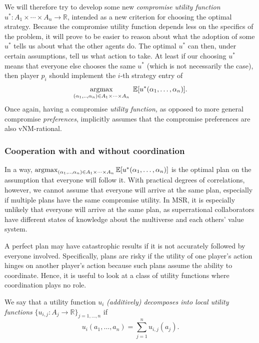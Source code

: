 We will therefore try to develop some new \emph{compromise utility
function} \(u^{*}\colon A_{1} \times \dotsm \times A_{n} \rightarrow \mathbb{R}\),
intended as a new criterion for choosing the optimal strategy. Because
the compromise utility function depends less on the specifics of the
problem, it will prove to be easier to reason about what the adoption of
some \(u^{*}\) tells us about what the other agents do. The optimal
\(u^{*}\) can then, under certain assumptions, tell us what action to
take. At least if our choosing \(u^{*}\) means that everyone else
chooses the same \(u^{*}\) (which is not necessarily the case), then
player \(p_{i}\) should implement the \(i\)-th strategy entry of
$$
\operatorname*{\arg\!\max}_{(\alpha_{1},..,\alpha_{n}) \in A_{1} \times \dotsm \times A_{n}}\ \mathbb{E}\lbrack u^{*}(\alpha_{1},\dotsc,\alpha_{n})\rbrack.
$$
Once again, having a compromise \emph{utility function,} as opposed to
more general compromise \emph{preferences}, implicitly assumes that the
compromise preferences are also vNM-rational.

\hypertarget{cooperation-with-and-without-coordination}{\subsubsection{Cooperation
with and without
coordination}\label{cooperation-with-and-without-coordination}}

In a way, \(\operatorname*{\arg\!\max}_{(\alpha_{1},..,\alpha_{n}) \in A_{1} \times \dotsm \times A_{n}}
\mathbb{E}\lbrack u^{*}(\alpha_{1},\dotsc,\alpha_{n})\rbrack\) is the optimal plan on the assumption
that everyone will follow it. With practical degrees of correlations, however, we cannot assume that
everyone will arrive at the same plan, especially if multiple plans have
the same compromise utility. In MSR, it is especially unlikely that
everyone will arrive at the same plan, as superrational collaborators
have different states of knowledge about the multiverse and each others'
value system.

A perfect plan may have catastrophic results if it is not accurately
followed by everyone involved. Specifically, plans are risky if the
utility of one player's action hinges on another player's action because
such plans assume the ability to coordinate. Hence, it is useful to look
at a class of utility functions where coordination plays no role.

We say that a utility function \(u_{i}\) \emph{(additively) decomposes
into local utility functions}
\(\{ u_{i,j}\colon A_j \rightarrow \mathbb{R}\}_{j = 1,\dotsc,n}\) if
$$
u_{i}(a_{1},\dotsc,a_{n}) = \sum_{j=1}^n u_{i,j}(a_{j}).
$$

